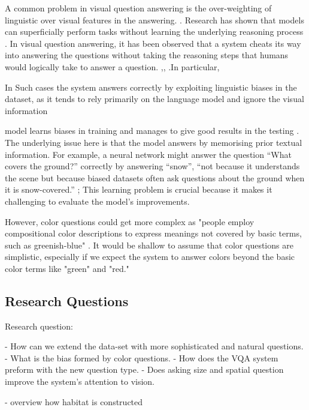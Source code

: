 A common problem in visual question answering is the over-weighting of linguistic over visual features in the answering. \cite{fukui2016multimodal}. Research has shown that models can superficially perform tasks without learning the underlying reasoning process \cite{turmsimple}. In visual question answering, it has been observed that a system cheats its way into answering the questions without taking the reasoning steps that humans would logically take to answer a question. \cite{agrawal2016analyzing},\cite{zhang2016yin}, \cite {fukui2016multimodal}.In particular, 

In Such cases the system answers correctly by exploiting linguistic biases in the dataset, as it tends to rely primarily on the language model and ignore the visual information \cite {goyal2017making}

model learns biases in training and manages to give good results in the testing \cite{selvaraju2020squinting}. The underlying issue here is that the model answers by memorising prior textual information. For example, a neural network might answer the question “What covers the ground?” correctly by answering “snow”, “not because it understands the scene but because biased datasets often ask questions about the ground when it is snow-covered.” \cite{johnson2017clevr}; This learning problem is crucial because it makes it challenging to evaluate the model’s improvements\cite{agrawal2018don}.


However, color questions could get more complex as "people employ compositional color descriptions to express meanings not covered by basic terms, such as greenish-blue" \cite{monroe2016learning}. It would be shallow to assume that color questions are simplistic, especially if we expect the system to answer colors beyond the basic color terms like "green" and "red." 


\subsection{Research Questions}



Research question: 

- How can we extend the data-set with more sophisticated and natural questions.
- What is the bias formed by color questions. 
- How does the VQA system preform with the new question type. 
- Does asking size and spatial question improve the system's attention to vision.  


- overview how habitat is constructed 

